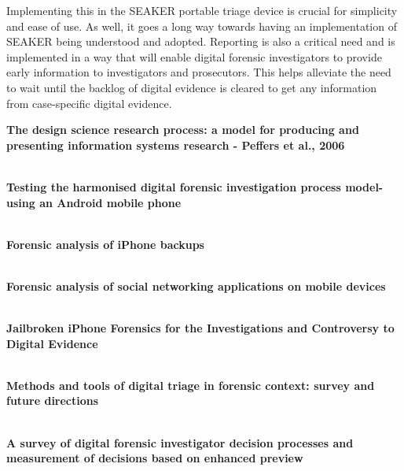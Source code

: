 \documentclass[12pt]{article}
\begin{document}
Implementing this in the SEAKER portable triage device is crucial for simplicity and ease of use.  As well, it goes a
long way towards having an implementation of SEAKER being understood and adopted.  Reporting is also a critical need
and is implemented in a way that will enable digital forensic investigators to provide early information to
investigators and prosecutors.  This helps alleviate the need to wait until the backlog of digital evidence is cleared
to get any information from case-specific digital evidence.
\vspace{0.5 cm}

\textbf{The design science research process: a model for producing and presenting information systems research - Peffers et al., 2006\cite{peffers2006design}}\\
\\
\vspace{0.5 cm}

\textbf{Testing the harmonised digital forensic investigation process model-using an Android mobile phone \cite{omeleze2013testing}}\\
\\
\vspace{0.5 cm}

\textbf{Forensic analysis of iPhone backups \cite{satishforensic}}\\
\\
\vspace{0.5 cm}

\textbf{Forensic analysis of social networking applications on mobile devices \cite{al2012forensic}}\\
\\
\vspace{0.5 cm}

\textbf{Jailbroken iPhone Forensics for the Investigations and Controversy to Digital Evidence \cite{chang2015jailbroken}}\\
\\
\vspace{0.5 cm}

\textbf{Methods and tools of digital triage in forensic context: survey and future directions \cite{jusas2017methods}}\\
\\
\vspace{0.5 cm}

\textbf{A survey of digital forensic investigator decision processes and measurement of decisions based on enhanced preview \cite{james2013survey}}\\
\\
\vspace{0.5 cm}
\end{document}
